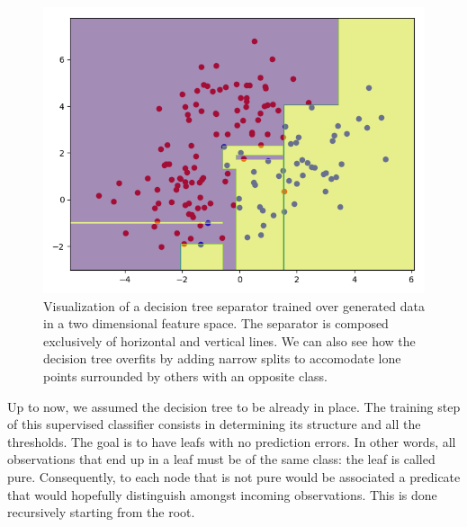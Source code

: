         \begin{figure}[htbp]
            \centering
            \includegraphics[width=.5\textwidth]{images/related_work/decision_tree_separator}
            \caption[
                Visualization of a decision tree separator trained over generated data in a two dimensional feature space.
            ]{
                \label{fig::decision_tree_separator}
                Visualization of a decision tree separator trained over generated data in a two dimensional feature space.
                The separator is composed exclusively of horizontal and vertical lines.
                We can also see how the decision tree overfits by adding narrow splits to accomodate lone points surrounded by others with an opposite class.
            }
        \end{figure}

        Up to now, we assumed the decision tree to be already in place.
        The training step of this supervised classifier consists in determining its structure and all the thresholds.
        The goal is to have leafs with no prediction errors.
        In other words, all observations that end up in a leaf must be of the same class: the leaf is called pure.
        Consequently, to each node that is not pure would be associated a predicate that would hopefully distinguish amongst incoming observations.
        This is done recursively starting from the root.\\

